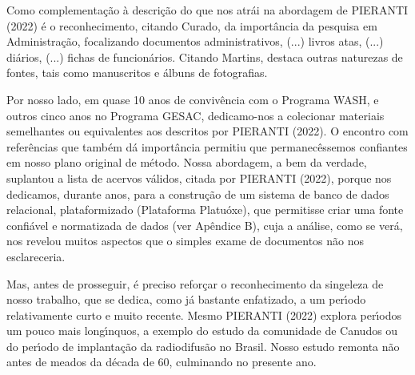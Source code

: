 \documentclass[
12pt,		%
openright,	%
twoside,  %
a4paper,			%
chapter=TITLE,		%
english,			%
french,				%
spanish,			%
brazil				%
]{USPSC-classe/USPSC}
\begin{document}
Como complementa\c{c}\~ao \`a descri\c{c}\~ao do que nos atr\'ai na abordagem de  PIERANTI (2022) \'e o reconhecimento, citando Curado, da import\^ancia da pesquisa em Administra\c{c}\~ao, focalizando \textquotedbl documentos administrativos, (...) livros atas, (...) di\'arios, (...) fichas de funcion\'arios\textquotedbl . Citando Martins, destaca outras naturezas de fontes, tais como manuscritos e \'albuns de fotografias.

















Por nosso lado, em quase 10 anos de conviv\^encia com o Programa WASH, e outros cinco anos no Programa GESAC, dedicamo-nos a colecionar materiais semelhantes ou equivalentes aos descritos por PIERANTI (2022). O encontro com refer\^encias que tamb\'em d\'a import\^ancia permitiu que permanec\^essemos confiantes em nosso plano original de m\'etodo. Nossa abordagem, a bem da verdade, suplantou a lista de acervos v\'alidos, citada por  PIERANTI (2022), porque nos dedicamos, durante anos, para a constru\c{c}\~ao de um sistema de banco de dados relacional, plataformizado (Plataforma Platu\'oxe), que permitisse criar uma fonte confi\'avel e normatizada de dados (ver Ap\^endice B), cuja a an\'alise, como se ver\'a, nos revelou muitos aspectos que o simples exame de documentos n\~ao nos esclareceria.

















Mas, antes de prosseguir, \'e preciso refor\c{c}ar o reconhecimento da singeleza de nosso trabalho, que se dedica, como j\'a bastante enfatizado, a um per\'{\i}odo relativamente curto e muito recente. Mesmo PIERANTI (2022) explora per\'{\i}odos um pouco mais long\'{\i}nquos, a exemplo do estudo da comunidade de Canudos ou do per\'{\i}odo de implanta\c{c}\~ao da radiodifus\~ao no Brasil. Nosso estudo remonta n\~ao antes de meados da d\'ecada de 60, culminando no presente ano.
\end{document}
